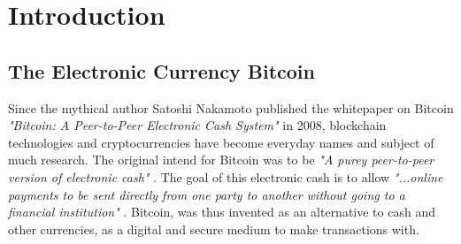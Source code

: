 \chapter{Introduction}
\label{sec:org06668a7}
\begin{comment}
OUTLINE:
    * Cryptocurrency
    * INtroduced by Satoshi Nakimoto
    * A future of the currencies of financial markets. 
    * Doubts if this may be possible.
    * Viewed more as a speculative asset.
    * Due to huge volatility.
    * And large jumps.
    * Volatility is an important measure in finance.
    * Volatility in a high frequency setting.
    * Jumps in volatility 
    * Volatility is non-linear
    * Most models used are often linear.
    * The success of machine learning, and especially deep learning.
    * Gives availability to non-linear models.
    * But the deep learning models may not be fit for time series data and inference.
    * How if we combine the two - can we use the neural networks to improve the econometric model's prediction accuracy and the econometric models to improve the inference of the neural networks?
\end{comment}

\section{The Electronic Currency Bitcoin}
\label{sec:org92klsa0}
Since the mythical author Satoshi Nakamoto published the whitepaper on Bitcoin \textit{"Bitcoin: A Peer-to-Peer Electronic Cash System"} in 2008, blockchain technologies and cryptocurrencies have become everyday names and subject of much research.
The original intend for Bitcoin was to be \textit{"A purey peer-to-peer version of electronic cash"} \cite[p. 1]{nakamotoBitcoinPeertoPeerElectronic2008}.
The goal of this electronic cash is to allow \textit{"...online payments to be sent directly from one party to another without going to a financial institution"} \cite[p. 1]{nakamotoBitcoinPeertoPeerElectronic2008}.
Bitcoin, was thus invented as an alternative to cash and other currencies, as a digital and secure medium to make transactions with.

